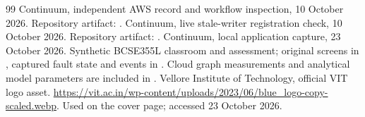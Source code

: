 \begin{thebibliography}{99}
 Continuum, independent AWS record and workflow inspection, 10 October 2026. Repository artifact: .
 Continuum, live stale-writer registration check, 10 October 2026. Repository artifact: .
 Continuum, local application capture, 23 October 2026. Synthetic BCSE355L classroom and assessment; original screens in , captured fault state and events in . Cloud graph measurements and analytical model parameters are included in .
 Vellore Institute of Technology, official VIT logo asset. \url{https://vit.ac.in/wp-content/uploads/2023/06/blue_logo-copy-scaled.webp}. Used on the cover page; accessed 23 October 2026.
\end{thebibliography}
\endgroup
